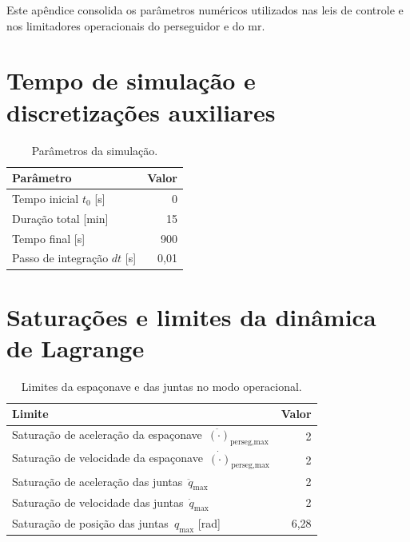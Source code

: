 
\label{ap_apendiceC_parametros_controle}

Este apêndice consolida os parâmetros numéricos utilizados nas leis de controle e nos limitadores operacionais do perseguidor e do \gls{mr}.

\section{Tempo de simulação e discretizações auxiliares}
\label{apC_tempo_dt}

\begin{table}[H]
\centering
\caption{Parâmetros da simulação.}
\label{ttab_apC_tempo_dt}
\begin{tabular}{lr}
\toprule
\textbf{Parâmetro} & \textbf{Valor} \\
\midrule
Tempo inicial $t_0$ [s]          & 0 \\
Duração total [min]              & 15 \\
Tempo final [s]                  & 900 \\
Passo de integração $dt$ [s]     & 0,01 \\
\bottomrule
\end{tabular}
\end{table}



\section{Saturações e limites da dinâmica de Lagrange}
\label{apC_saturacoes_lagrange}

\begin{table}[H]
\centering
\caption{Limites da espaçonave e das juntas no modo operacional.}
\label{ttab_apC_saturacoes_lagrange}
\begin{tabular}{lr}
\toprule
\textbf{Limite} & \textbf{Valor} \\
\midrule
Saturação de aceleração da espaçonave $\,\ddot{(\cdot)}_{\text{perseg,max}}$ & 2 \\
Saturação de velocidade da espaçonave $\,\dot{(\cdot)}_{\text{perseg,max}}$  & 2 \\
Saturação de aceleração das juntas $\,\ddot{q}_{\max}$                       & 2 \\
Saturação de velocidade das juntas $\,\dot{q}_{\max}$                        & 2 \\
Saturação de posição das juntas $\,q_{\max}$ [rad]                           & 6,28 \\
\bottomrule
\end{tabular}
\end{table}

